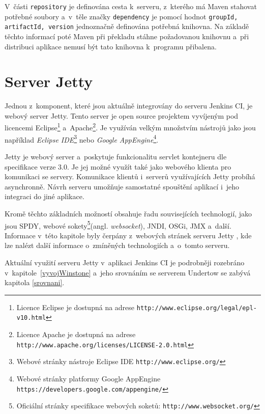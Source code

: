         V~části \texttt{repository} je definována cesta k~serveru, z~kterého má Maven stahovat potřebné soubory
        a~v~těle značky \texttt{dependency} je pomocí hodnot \texttt{groupId, artifactId, version} jednoznačně
        definována potřebná knihovna. Na základě těchto informací poté Maven při překladu stáhne požadovanou
        knihovnu a~při distribuci aplikace nemusí být tato knihovna k~programu přibalena. 


    \section{Server Jetty} \label{jetty}
        Jednou z~komponent, které jsou aktuálně integrovány do serveru Jenkins CI, je webový server Jetty.
        Tento server je open source projektem vyvíjeným pod licencemi 
        Eclipse\footnote{Licence Eclipse je dostupná na adrese \texttt{http://www.eclipse.org/legal/epl-v10.html}}
        a~Apache\footnote{Licence Apache je dostupná 
        na adrese \texttt{http://www.apache.org/licenses/LICENSE-2.0.html}}. 
            Je využíván velkým množstvím nástrojů jako jsou například \emph{Eclipse IDE}\footnote{Webové stránky nástroje Eclipse IDE 
        \texttt{http://www.eclipse.org/}} nebo \emph{Google AppEngine}\footnote{Webové stránky platformy Google AppEngine
        \texttt{https://developers.google.com/appengine/}}.

        Jetty je webový server a~poskytuje funkcionalitu servlet kontejneru dle specifikace verze 3.0. 
        Je jej možné využít také jako webového klienta pro komunikaci se servery. Komunikace
        klientů i~serverů využívajících Jetty probíhá asynchronně. 
        Návrh serveru umožňuje samostatné spouštění aplikací i~jeho integraci do jiné aplikace. 

        Kromě těchto základních možností obsahuje
        řadu souvisejících technologií, jako jsou SPDY, webové sokety\footnote{Oficiální stránky 
            specifikace webových soketů: \texttt{http://www.websocket.org/}}(angl. \emph{websocket}),
        JNDI, OSGi, JMX a~další. 
        Informace v~této kapitole byly čerpány z~webových stránek serveru Jetty \cite{jettyWeb}, kde lze nalézt 
        další informace o~zmíněných technologiích a~o~tomto serveru.
        
        Aktuální využití serveru Jetty v~aplikaci Jenkins CI je podrobněji rozebráno
        v~kapitole~\ref{vyvojWinstone} a~jeho srovnáním se serverem Undertow se 
        zabývá kapitola \ref{srovnani}.
        

